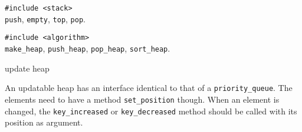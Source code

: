 {\tt \#include <stack>}\\
{\tt push}, {\tt empty}, {\tt top}, {\tt pop}.

{\tt \#include <algorithm>}\\
{\tt make\_heap}, {\tt push\_heap}, {\tt pop\_heap}, {\tt sort\_heap}.
\begin{algorithm}{update heap}

An updatable heap has an interface identical to that of a
{\tt priority\_queue}.
The elements need to have a method {\tt set\_position} though. When an element
is changed, the {\tt key\_increased} or {\tt key\_decreased} method should
be called with its position as argument.
\end{algorithm}

\begin{sourceslandscape}
\end{sourceslandscape}
